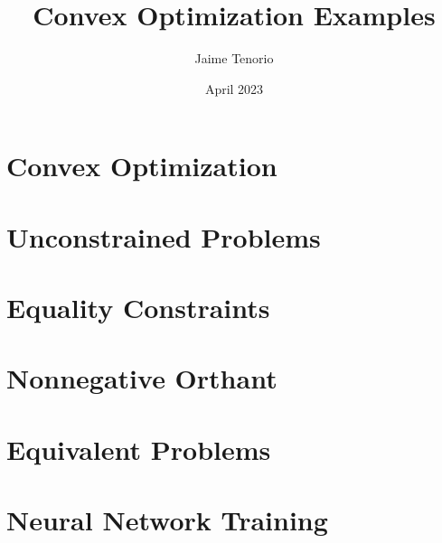\documentclass{article}
\title{Convex Optimization Examples}
\author{Jaime Tenorio}
\date{April 2023}
\begin{document}
\maketitle

\section{Convex Optimization}




\section{Unconstrained Problems}




\section{Equality Constraints}




\section{Nonnegative Orthant}




\section{Equivalent Problems}

%


\section{Neural Network Training}









\end{document}
